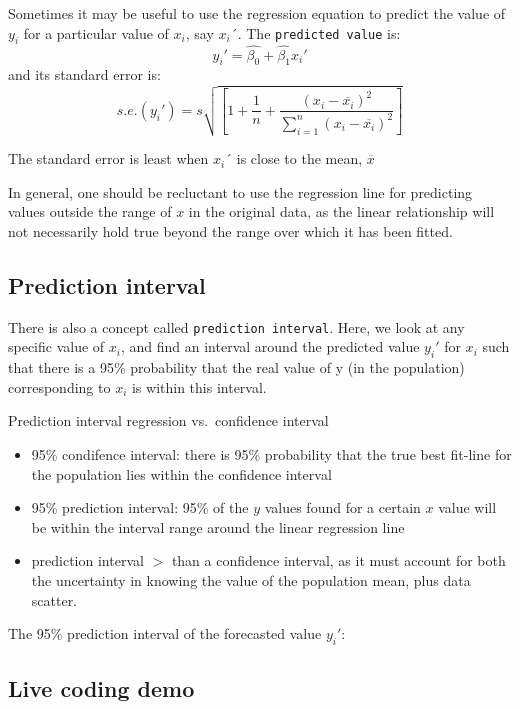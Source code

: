 \documentclass[]{article}
\providecommand{\tightlist}{%
  \setlength{\itemsep}{0pt}\setlength{\parskip}{0pt}}
\begin{document}
Sometimes it may be useful to use the regression equation to predict the
value of \(y_i\) for a particular value of \(x_i\), say \(x_i´\). The
\texttt{predicted\ value} is: \[y_i'=\hat{\beta_0}+\hat{\beta_1}x_i'\]
and its standard error is:
\[s.e.(y_i')=s\sqrt{[1+\frac{1}{n}+\frac{(x_i-\overline{x_i})^2}{\sum_{i=1}^{n}(x_i-\overline{x_i})^2}]}\]

The standard error is least when \(x_i´\) is close to the mean,
\(\overline{x}\)

In general, one should be recluctant to use the regression line for
predicting values outside the range of \(x\) in the original data, as
the linear relationship will not necessarily hold true beyond the range
over which it has been fitted.

\hypertarget{prediction-interval}{%
\subsection{Prediction interval}\label{prediction-interval}}

There is also a concept called \texttt{prediction\ interval}. Here, we
look at any specific value of \(x_i\), and find an interval around the
predicted value \(y_i'\) for \(x_i\) such that there is a 95\%
probability that the real value of y (in the population) corresponding
to \(x_i\) is within this interval.

Prediction interval regression vs.~confidence interval

\begin{itemize}
\tightlist
\item
  95\% condifence interval: there is 95\% probability that the true best
  fit-line for the population lies within the confidence interval
\item
  95\% prediction interval: 95\% of the \(y\) values found for a certain
  \(x\) value will be within the interval range around the linear
  regression line
\item
  prediction interval \(>\) than a confidence interval, as it must
  account for both the uncertainty in knowing the value of the
  population mean, plus data scatter.
\end{itemize}

The 95\% prediction interval of the forecasted value \(y_i'\):

\hypertarget{live-coding-demo-1}{%
\subsection{Live coding demo}\label{live-coding-demo-1}}
\end{document}

